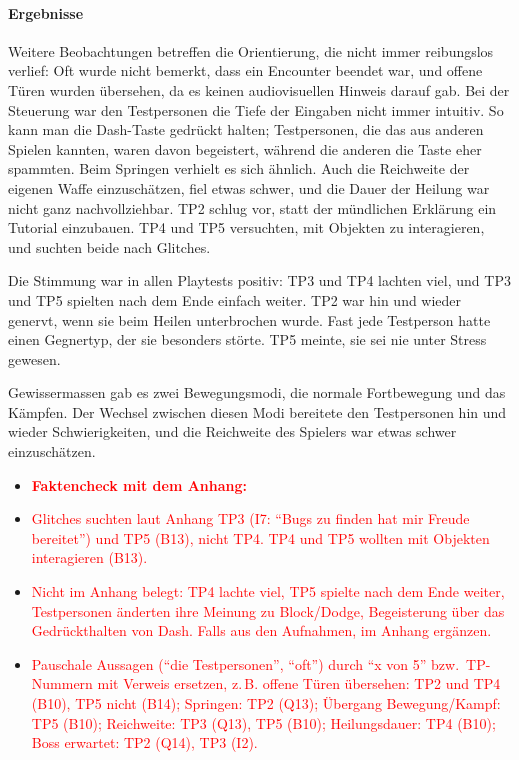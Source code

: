 \documentclass[../Main.tex]{subfiles}
\begin{document}
\paragraph{Ergebnisse}
Weitere Beobachtungen betreffen die Orientierung, die nicht immer reibungslos verlief: Oft wurde nicht bemerkt, dass ein Encounter beendet war, und offene Türen wurden übersehen, da es keinen audiovisuellen Hinweis darauf gab. Bei der Steuerung war den Testpersonen die Tiefe der Eingaben nicht immer intuitiv. So kann man die Dash-Taste gedrückt halten; Testpersonen, die das aus anderen Spielen kannten, waren davon begeistert, während die anderen die Taste eher spammten. Beim Springen verhielt es sich ähnlich. Auch die Reichweite der eigenen Waffe einzuschätzen, fiel etwas schwer, und die Dauer der Heilung war nicht ganz nachvollziehbar. TP2 schlug vor, statt der mündlichen Erklärung ein Tutorial einzubauen. TP4 und TP5 versuchten, mit Objekten zu interagieren, und suchten beide nach Glitches.

Die Stimmung war in allen Playtests positiv: TP3 und TP4 lachten viel, und TP3 und TP5 spielten nach dem Ende einfach weiter. TP2 war hin und wieder genervt, wenn sie beim Heilen unterbrochen wurde. Fast jede Testperson hatte einen Gegnertyp, der sie besonders störte. TP5 meinte, sie sei nie unter Stress gewesen.

Gewissermassen gab es zwei Bewegungsmodi, die normale Fortbewegung und das Kämpfen. Der Wechsel zwischen diesen Modi bereitete den Testpersonen hin und wieder Schwierigkeiten, und die Reichweite des Spielers war etwas schwer einzuschätzen.

\begin{itemize}[leftmargin=1.5cm]
    \item \textcolor{red}{\textbf{Faktencheck mit dem Anhang:}}
    \item \textcolor{red}{Glitches suchten laut Anhang TP3 (I7: \enquote{Bugs zu finden hat mir Freude bereitet}) und TP5 (B13), nicht TP4. TP4 und TP5 wollten mit Objekten interagieren (B13).}
    \item \textcolor{red}{Nicht im Anhang belegt: TP4 lachte viel, TP5 spielte nach dem Ende weiter, Testpersonen änderten ihre Meinung zu Block/Dodge, Begeisterung über das Gedrückthalten von Dash. Falls aus den Aufnahmen, im Anhang ergänzen.}
    \item \textcolor{red}{Pauschale Aussagen (\enquote{die Testpersonen}, \enquote{oft}) durch \enquote{x von 5} bzw.\ TP-Nummern mit Verweis ersetzen, z.\,B. offene Türen übersehen: TP2 und TP4 (B10), TP5 nicht (B14); Springen: TP2 (Q13); Übergang Bewegung/Kampf: TP5 (B10); Reichweite: TP3 (Q13), TP5 (B10); Heilungsdauer: TP4 (B10); Boss erwartet: TP2 (Q14), TP3 (I2).}
\end{itemize}
\end{document}
